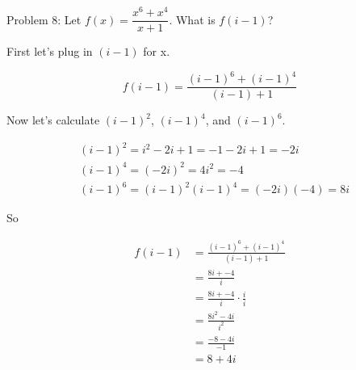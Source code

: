 Problem 8: Let $f(x) = \dfrac{x^6 + x^4}{x + 1}$. What is $f(i - 1)$?

First let's plug in $(i - 1)$ for x.

\[
f(i - 1) = \frac{(i - 1)^6 + (i - 1)^4}{(i - 1) + 1}
\]

Now let's calculate $(i - 1)^2$, $(i - 1)^4$, and $(i - 1)^6$.

\begin{align*}
& (i - 1)^2 = i^2 - 2i + 1 = -1 - 2i + 1 = -2i \\
& (i - 1)^4 = (-2i)^2 = 4i^2 = -4 \\
& (i - 1)^6 = (i - 1)^2 (i-1)^4 = (-2i)(-4) = 8i
\end{align*}

So

\begin{align*}
f(i - 1) &= \frac{(i - 1)^6 + (i - 1)^4}{(i - 1) + 1} \\
&= \frac{8i + -4}{i} \\
&= \frac{8i + -4}{i} \cdot \frac{i}{i} \\
&= \frac{8i^2 - 4i}{i^2} \\
&= \frac{-8 - 4i}{-1} \\
&= \boxed{8 + 4i}
\end{align*}
